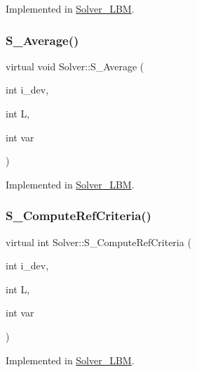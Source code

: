 Implemented in \hyperlink{classSolver__LBM_a9f5927018c5068edc1f31ead745a6e05}{Solver\+\_\+\+L\+BM}.

\mbox{\label{classSolver_a19b326267dbafa8b000b92a449c32b79}} 
\subsubsection{\texorpdfstring{S\+\_\+\+Average()}{S\_Average()}}
{\footnotesize\ttfamily virtual void Solver\+::\+S\+\_\+\+Average (\begin{DoxyParamCaption}\item[{int}]{i\+\_\+dev,  }\item[{int}]{L,  }\item[{int}]{var }\end{DoxyParamCaption})\hspace{0.3cm}{\ttfamily [pure virtual]}}



Implemented in \hyperlink{classSolver__LBM_ae4487d21dd9b3f94a4e6e367b37698fa}{Solver\+\_\+\+L\+BM}.

\mbox{\label{classSolver_a28e21b098bfcf7c69a9664a8a4413960}} 
\subsubsection{\texorpdfstring{S\+\_\+\+Compute\+Ref\+Criteria()}{S\_ComputeRefCriteria()}}
{\footnotesize\ttfamily virtual int Solver\+::\+S\+\_\+\+Compute\+Ref\+Criteria (\begin{DoxyParamCaption}\item[{int}]{i\+\_\+dev,  }\item[{int}]{L,  }\item[{int}]{var }\end{DoxyParamCaption})\hspace{0.3cm}{\ttfamily [pure virtual]}}



Implemented in \hyperlink{classSolver__LBM_a9c7637ab5e8dde0e9c957661758a738e}{Solver\+\_\+\+L\+BM}.

\mbox{\label{classSolver_a1b5b498836d6226bc425fb67bb7940d7}} 
